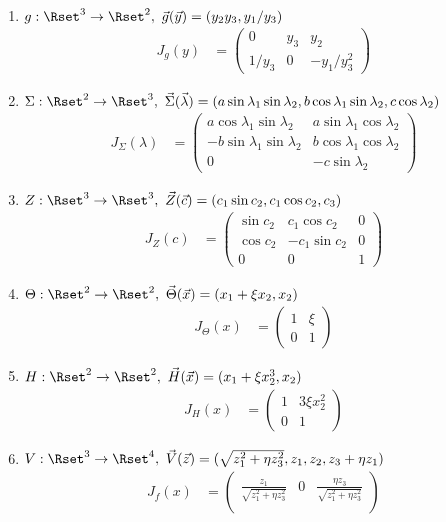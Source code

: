 \documentclass[11pt,answers]{exam}
\begin{document}
\begin{questions}
\begin{solution}
\begin{enumerate}
\item $g:\Rset^3\to\Rset^2,~\vec{g}(\vec{y})=(y_2y_3,y_1/y_3)$
\begin{align*}
J_g(y)&=\begin{pmatrix}
0 & y_3 & y_2 \\
1/y_3 & 0 & -y_1/y_3^2
\end{pmatrix}
\end{align*}
\item $\Sigma:\Rset^2\to\Rset^3,~\vec{\Sigma}(\vec{\lambda})=(a\sin\lambda_1\sin\lambda_2,b\cos\lambda_1\sin\lambda_2,c\cos\lambda_2)$
\begin{align*}
J_\Sigma(\lambda)&=\begin{pmatrix}
a\cos\lambda_1\sin\lambda_2 & a\sin\lambda_1\cos\lambda_2\\
-b\sin\lambda_1\sin\lambda_2 & b\cos\lambda_1\cos\lambda_2\\
0 & -c\sin\lambda_2
\end{pmatrix}
\end{align*}
\item $Z:\Rset^3\to\Rset^3,~\vec{Z}(\vec{c})=(c_1\sin c_2,c_1\cos c_2,c_3)$
\begin{align*}
J_Z(c)&=\begin{pmatrix}
\sin c_2 & c_1\cos c_2 & 0\\
\cos c_2 & -c_1\sin c_2 & 0\\
0 & 0 & 1
\end{pmatrix}
\end{align*}
\item $\Theta:\Rset^2\to\Rset^2,~\vec{\Theta}(\vec{x})=(x_1+\xi x_2,x_2)$
\begin{align*}
J_\Theta(x)&=\begin{pmatrix}
1 & \xi\\
0 & 1
\end{pmatrix}
\end{align*}
\item $H:\Rset^2\to\Rset^2,~\vec{H}(\vec{x})=(x_1+\xi x_2^3,x_2)$
\begin{align*}
J_H(x)&=\begin{pmatrix}
1 & 3\xi x_2^2\\
0 & 1
\end{pmatrix}
\end{align*}
\item $V:\Rset^3\to\Rset^4,~\vec{V}(\vec{z})=(\sqrt{z_1^2+\eta z_3^2},z_1,z_2,z_3+\eta z_1)$
\begin{align*}
J_f(x)&=\begin{pmatrix}
\frac{z_1}{\sqrt{z_1^2+\eta z_3^2}} & 0 & \frac{\eta z_3}{\sqrt{z_1^2+\eta z_3^2}} \\

\end{pmatrix}
\end{align*}
\end{enumerate}
\end{solution}
\end{questions}
\end{document}
